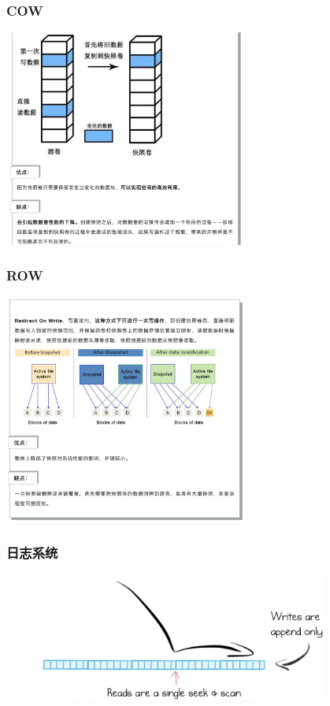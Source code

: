 \documentclass[UTF8,8pt,xcolor=dvipsnames]{beamer}
\begin{document}
\begin{frame}[fragile]
    \frametitle{COW}
    \begin{center}
        \includegraphics[width=0.6\textwidth]{../imgs/cow-snapshot.png}
    \end{center}
\end{frame}

\begin{frame}[fragile]
    \frametitle{ROW}
    \begin{center}
        \includegraphics[width=0.6\textwidth]{../imgs/row-snapshot.png}
    \end{center}
\end{frame}

\begin{frame}[fragile]
    \frametitle{日志系统}
    \begin{center}
        \includegraphics[width=0.8\textwidth]{../imgs/log-structured.png}
    \end{center}
\end{frame}
\end{document}
